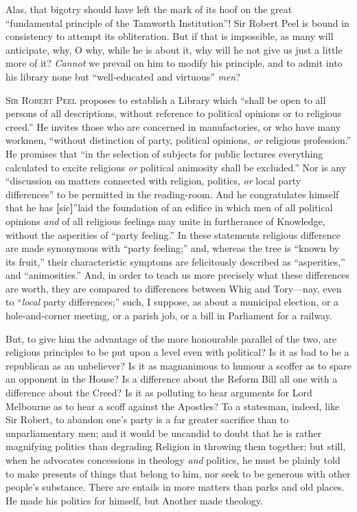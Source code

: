 Alas, that bigotry should have left the mark of its hoof on the
great ``fundamental principle of the Tamworth Institution''!
Sir Robert Peel is bound in consistency to attempt its obliteration.
But if that is impossible, as many will anticipate, why, O why, while
he is about it, why will he not give us just a little more of it? \emph{Cannot}
we prevail on him to modify his principle, and to admit into his
library none but ``well-educated and virtuous'' \emph{men}?


S\textsc{ir} R\textsc{obert} P\textsc{eel} proposes to establish a Library which
``shall be open to all persons of all descriptions, without
reference to political opinions or to religious creed.'' He
invites those who are concerned in manufactories, or who have many
workmen, ``without distinction of party, political opinions, \emph{or}
religious profession.'' He promises that ``in the selection of
subjects for public lectures everything calculated to excite religious
\emph{or} political animosity shall be excluded.'' Nor is any
``discussion on matters connected with religion, politics, \emph{or}
local party differences'' to be permitted in the reading-room. And
he congratulates himself that he has \textbf{[}sic\textbf{]}''laid the foundation of an
edifice in which men of all political opinions \emph{and} of all
religious feelings may unite in furtherance of Knowledge, without the
asperities of ``party feeling.'' In these statements religious
difference are made synonymous with ``party feeling;'' and,
whereas the tree is ``known by its fruit,'' their
characteristic symptoms are felicitously described as
``asperities,'' and ``animosities.'' And, in order to
teach us more precisely what these differences are worth, they are
compared to differences between Whig and Tory—nay, even to ``\emph{local}
party differences;'' such, I suppose, as about a municipal
election, or a hole-and-corner meeting, or a parish job, or a bill in
Parliament for a railway.

But, to give him the advantage of the more honourable parallel of the two, are religious principles to be put upon a level
even with political? Is it as bad to be a republican as an unbeliever?
Is it as magnanimous to humour a scoffer as to spare an opponent in
the House? Is a difference about the Reform Bill all one with a
difference about the Creed? Is it as polluting to hear arguments for
Lord Melbourne as to hear a scoff against the Apostles? To a
statesman, indeed, like Sir Robert, to abandon one's party is a far
greater sacrifice than to unparliamentary men; and it would be
uncandid to doubt that he is rather magnifying politics than degrading
Religion in throwing them together; but still, when he advocates
concessions in theology \emph{and} politics, he must be plainly told
to make presents of things that belong to him, nor seek to be generous
with other people's substance. There are entails in more matters than
parks and old places. He made his politics for himself, but Another
made theology.

